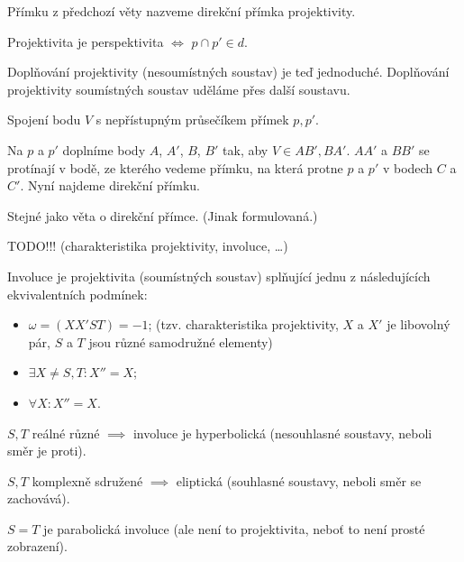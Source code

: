 \documentclass[12pt]{article}					%
\begin{document}
\begin{definice}
	Přímku z předchozí věty nazveme direkční přímka projektivity.
\end{definice}

\begin{poznamka}
	Projektivita je perspektivita $\Leftrightarrow$ $p \cap p' \in d$.
\end{poznamka}

\begin{priklad}
	Doplňování projektivity (nesoumístných soustav) je teď jednoduché. Doplňování projektivity soumístných soustav uděláme přes další soustavu.
\end{priklad}

\begin{priklad}
	Spojení bodu $V$ s nepřístupným průsečíkem přímek $p, p'$.

	\begin{reseni}
		Na $p$ a $p'$ doplníme body $A$, $A'$, $B$, $B'$ tak, aby $V \in AB', BA'$. $AA'$ a $BB'$ se protínají v bodě, ze kterého vedeme přímku, na která protne $p$ a $p'$ v bodech $C$ a $C'$. Nyní najdeme direkční přímku.
	\end{reseni}
\end{priklad}

\begin{veta}
	Stejné jako věta o direkční přímce. (Jinak formulovaná.)
\end{veta}


TODO!!! (charakteristika projektivity, involuce, …)

\begin{definice}[Involuce]
	Involuce je projektivita (soumístných soustav) splňující jednu z následujících ekvivalentních podmínek:
	\begin{itemize}
		\item $ω = (XX'ST) = -1$; (tzv. charakteristika projektivity, $X$ a $X'$ je libovolný pár, $S$ a $T$ jsou různé samodružné elementy)
		\item $\exists X ≠ S, T: X'' = X$;
		\item $\forall X: X'' = X$.
	\end{itemize}
\end{definice}

\begin{definice}
	$S, T$ reálné různé $\implies$ involuce je hyperbolická (nesouhlasné soustavy, neboli směr je proti).

	$S, T$ komplexně sdružené $\implies$ eliptická (souhlasné soustavy, neboli směr se zachovává).

	\begin{poznamka}
		$S = T$ je parabolická involuce (ale není to projektivita, neboť to není prosté zobrazení).
	\end{poznamka}
\end{definice}
\end{document}
